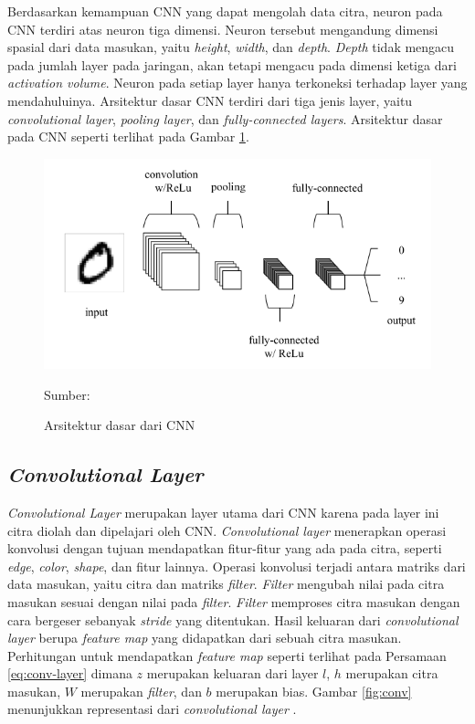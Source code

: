 Berdasarkan kemampuan CNN yang dapat mengolah data citra, neuron pada CNN terdiri atas neuron tiga dimensi. Neuron tersebut mengandung dimensi spasial dari data masukan, yaitu \textit{height}, \textit{width}, dan \textit{depth}. \textit{Depth} tidak mengacu pada jumlah layer pada jaringan, akan tetapi mengacu pada dimensi ketiga dari \textit{activation volume}. Neuron pada setiap layer hanya terkoneksi terhadap layer yang mendahuluinya. Arsitektur dasar CNN terdiri dari tiga jenis layer, yaitu \textit{convolutional layer}, \textit{pooling layer}, dan \textit{fully-connected layers}. Arsitektur dasar pada CNN seperti terlihat pada Gambar \ref{fig:cnn}.

\begin{figure}[H]
    \begin{center}
        \includegraphics[width=12cm]{img/bab2/cnn.png}
        \caption{Arsitektur dasar dari CNN}
        \label{fig:cnn}
        Sumber: \citep{OShea2015}
    \end{center}
\end{figure}

    \subsection{\textit{Convolutional Layer}}
    \textit{Convolutional Layer} merupakan layer utama dari CNN karena pada layer ini citra diolah dan dipelajari oleh CNN. \textit{Convolutional layer} menerapkan operasi konvolusi dengan tujuan mendapatkan fitur-fitur yang ada pada citra, seperti \textit{edge}, \textit{color}, \textit{shape}, dan fitur lainnya. Operasi konvolusi terjadi antara matriks dari data masukan, yaitu citra dan matriks \textit{filter}. \textit{Filter} mengubah nilai pada citra masukan sesuai dengan nilai pada \textit{filter}. \textit{Filter} memproses citra masukan dengan cara bergeser sebanyak \textit{stride} yang ditentukan. Hasil keluaran dari \textit{convolutional layer} berupa \textit{feature map} yang didapatkan dari sebuah citra masukan. Perhitungan untuk mendapatkan \textit{feature map} seperti terlihat pada Persamaan \ref{eq:conv-layer} dimana $z$ merupakan keluaran dari layer $l$, $h$ merupakan citra masukan, $W$ merupakan \textit{filter}, dan $b$ merupakan bias. Gambar \ref{fig:conv} menunjukkan representasi dari \textit{convolutional layer} \citep{OShea2015}.

